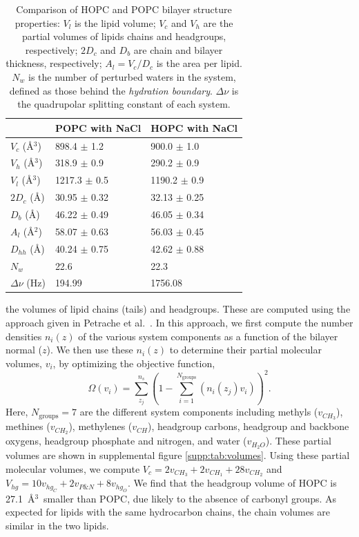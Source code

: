 \documentclass[12pt,preprint,times,openany,draft]{book}
\begin{document}
\begin{table}
\caption{ 
Comparison of HOPC and POPC bilayer structure properties: $V_l$ is the lipid
volume; $V_c$ and $V_h$ are the partial volumes of lipids chains and headgroups,
respectively; $2D_c$ and $D_b$ are chain and bilayer thickness, respectively; $A_l=V_c/D_c$ is the area per lipid.
$N_{w}$ is the number of perturbed waters in the system, defined as those behind the \emph{hydration boundary}. $\Delta \nu$ is the quadrupolar splitting constant of each system.}
\label{tab:struc}
\begin{tabularx}{\textwidth}{X|X|X}%
& POPC with NaCl & HOPC with NaCl \\ \hline
$V_c$ (\AA$^3$) & 898.4 $\pm$ 1.2 & 900.0 $\pm$ 1.0   \\
$V_h$ (\AA$^3$) & 318.9 $\pm$ 0.9 & 290.2 $\pm$ 0.9   \\
$V_l$ (\AA$^3$) & 1217.3 $\pm$ 0.5 & 1190.2 $\pm$ 0.9   \\
$2D_c$ (\AA) & 30.95 $\pm$ 0.32 & 32.13 $\pm$ 0.25   \\
$D_b$ (\AA) & 46.22 $\pm$ 0.49 & 46.05 $\pm$ 0.34   \\
$A_l$ (\AA$^2$) & 58.07 $\pm$ 0.63 & 56.03 $\pm$ 0.45   \\
$D_{hh}$ (\AA) & 40.24 $\pm$ 0.75 & 42.62 $\pm$ 0.88   \\
$N_{w}$ & 22.6 & 22.3  \\ 
$\Delta \nu$ (Hz) & 194.99 & 1756.08 \\
\end{tabularx}
\end{table}
the volumes of lipid chains (tails) and headgroups. These are computed using the approach given in 
Petrache et al.~\cite{petrache:1997}. In this approach, 
we first compute the number densities $n_i(z)$ of the various system 
components as a function of the bilayer normal ($z$). We then use these 
$n_i(z)$ to determine their partial molecular volumes, $v_i$, by optimizing the objective function, 
\begin{equation}
\label{eq:petrache}
\Omega(v_i)=\sum^{n_s}_{z_j}(1-\sum_{i=1}^{N_{\text{groups}}}(n_i(z_j)v_i))^2.
\end{equation}
Here, $N_{\text{groups}}=7$ are the different system 
components including methyls ($v_{CH_3}$), methines ($v_{CH_2}$), 
methylenes ($v_{CH}$), headgroup carbons, headgroup and backbone oxygens, headgroup phosphate
and nitrogen, and water ($v_{H_2O}$). These partial volumes are shown in supplemental figure
\ref{supp:tab:volumes}.
Using these partial molecular volumes, we compute 
$V_c = 2v_{CH_3} + 2v_{CH_1} + 28v_{CH_2}$ and $V_{hg} = 10v_{hg_C} + 2v_{P\text{\&}N} + 8v_{hg_O}$. 
We find that the headgroup volume of HOPC is 
27.1~\AA$^3$~smaller than POPC, due likely to the absence of carbonyl groups. 
As expected for lipids with the same
hydrocarbon chains, the chain volumes are similar in the two lipids.
\end{document}
